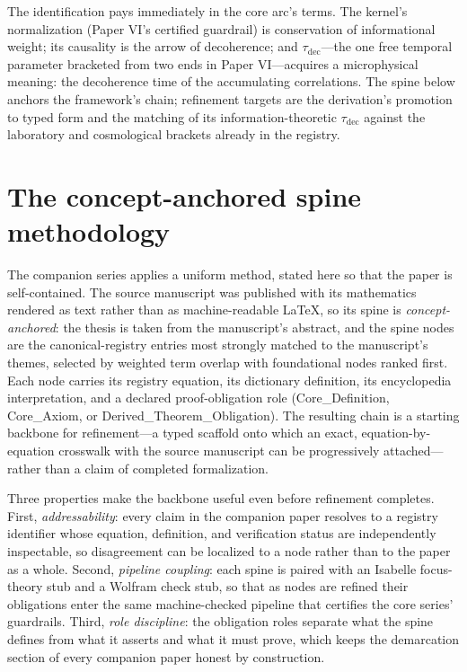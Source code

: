 \documentclass[11pt]{article}
\theoremstyle{remark}
\begin{document}
The identification pays immediately in the core arc's terms. The kernel's normalization (Paper VI's certified guardrail) is conservation of informational weight; its causality is the arrow of decoherence; and $\tau_{\mathrm{dec}}$---the one free temporal parameter bracketed from two ends in Paper VI---acquires a microphysical meaning: the decoherence time of the accumulating correlations. The spine below anchors the framework's chain; refinement targets are the derivation's promotion to typed form and the matching of its information-theoretic $\tau_{\mathrm{dec}}$ against the laboratory and cosmological brackets already in the registry.

\section{The concept-anchored spine methodology}
\label{sec:method}

The companion series applies a uniform method, stated here so that the paper is self-contained. The source manuscript was published with its mathematics rendered as text rather than as machine-readable LaTeX, so its spine is \emph{concept-anchored}: the thesis is taken from the manuscript's abstract, and the spine nodes are the canonical-registry entries most strongly matched to the manuscript's themes, selected by weighted term overlap with foundational nodes ranked first. Each node carries its registry equation, its dictionary definition, its encyclopedia interpretation, and a declared proof-obligation role (Core\_Definition, Core\_Axiom, or Derived\_Theorem\_Obligation). The resulting chain is a starting backbone for refinement---a typed scaffold onto which an exact, equation-by-equation crosswalk with the source manuscript can be progressively attached---rather than a claim of completed formalization.

Three properties make the backbone useful even before refinement completes. First, \emph{addressability}: every claim in the companion paper resolves to a registry identifier whose equation, definition, and verification status are independently inspectable, so disagreement can be localized to a node rather than to the paper as a whole. Second, \emph{pipeline coupling}: each spine is paired with an Isabelle focus-theory stub and a Wolfram check stub, so that as nodes are refined their obligations enter the same machine-checked pipeline that certifies the core series' guardrails. Third, \emph{role discipline}: the obligation roles separate what the spine defines from what it asserts and what it must prove, which keeps the demarcation section of every companion paper honest by construction.
\end{document}
